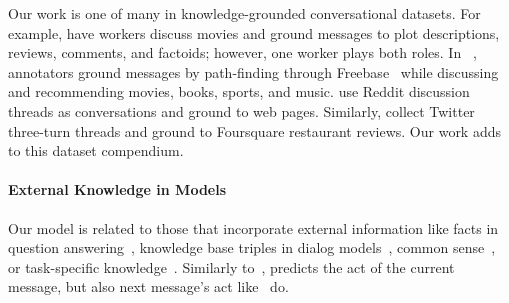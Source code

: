 Our work is one of many in knowledge-grounded conversational datasets.
For example, \citet{Moghe2018TowardsEB} have workers discuss movies and ground messages to plot descriptions, reviews, comments, and factoids; however, one worker plays both roles.
In \opendialkg{}~\cite{moon-etal-2019-opendialkg}, annotators ground messages by path-finding through Freebase~\citep{Bast2014EasyAT} while discussing and recommending movies, books, sports, and music.
\citet{Qin2019ConversingBR} use Reddit discussion threads as conversations and ground to web pages.
Similarly, \citet{ghazvininejad2018a} collect Twitter three-turn threads and ground to Foursquare restaurant reviews.
Our work adds to this dataset compendium.

\paragraph{External Knowledge in Models} Our model is related to those that incorporate external information like facts in question answering~\citep{Weston2015MemoryN,Sukhbaatar2015EndToEndMN,kvnets2016}, knowledge base triples in dialog models~\citep{Han2015ExploitingKB,He2017LearningSC,Parthasarathi2018ExtendingNG}, common sense~\citep{Young2017AugmentingED,Zhou2018CommonsenseKA}, or task-specific knowledge~\citep{Eric2017KeyValueRN}.
Similarly to~\citet{kalchbrenner-blunsom-2013-recurrent,khanpour-etal-2016-dialogue}, \charm{} predicts the act of the current message, but also next message's act like~\citet{tanaka-etal-2019-dialogue} do.
